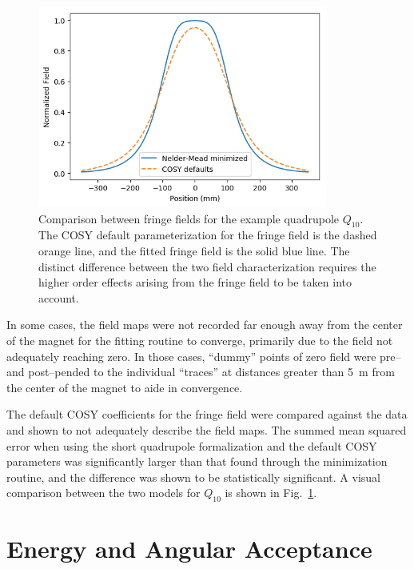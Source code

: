 \begin{figure}[t]
    \begin{center}
        \centerline{
            \includegraphics[width=0.85\textwidth]{figures/enge_comparison.png}}
        \caption[Comparison between fringe fields]{Comparison between fringe
            fields for the example quadrupole $Q_{10}$. The COSY default
            parameterization for the fringe field is the dashed orange line,
            and the fitted fringe field is the solid blue line. The distinct
            difference between the two field characterization requires the
            higher order effects arising from the fringe field to be taken into
            account.}
        \label{fig:enge_comparison}
    \end{center}
\end{figure}

In some cases, the field maps were not recorded far enough away from the center
of the magnet for the fitting routine to converge, primarily due to the field
not adequately reaching zero. In those cases, ``dummy'' points of zero field
were pre\---{} and post\---{}pended to the individual ``traces'' at distances
greater than 5~m from the center of the magnet to aide in convergence.

The default COSY coefficients for the fringe field were compared against the
data and shown to not adequately describe the field maps. The summed mean
squared error when using the short quadrupole formalization and the default
COSY parameters was significantly larger than that found through the
minimization routine, and the difference was shown to be statistically
significant. A visual comparison between the two models for $Q_{10}$ is shown
in Fig.~\ref{fig:enge_comparison}.


\section{Energy and Angular Acceptance}
\label{sec:commissioning}


